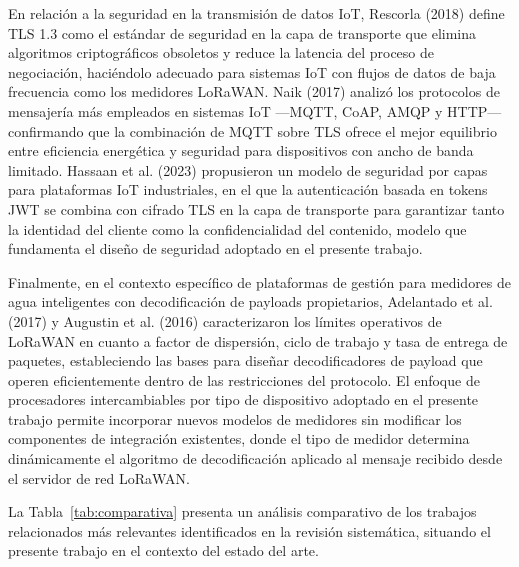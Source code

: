 \documentclass[12pt,a4paper,oneside]{report}
\begin{document}
En relación a la seguridad en la transmisión de datos IoT, Rescorla (2018) define TLS 1.3 como el estándar de seguridad en la capa de transporte que elimina algoritmos criptográficos obsoletos y reduce la latencia del proceso de negociación, haciéndolo adecuado para sistemas IoT con flujos de datos de baja frecuencia como los medidores LoRaWAN. Naik (2017) analizó los protocolos de mensajería más empleados en sistemas IoT ---MQTT, CoAP, AMQP y HTTP--- confirmando que la combinación de MQTT sobre TLS ofrece el mejor equilibrio entre eficiencia energética y seguridad para dispositivos con ancho de banda limitado. Hassaan et al. (2023) propusieron un modelo de seguridad por capas para plataformas IoT industriales, en el que la autenticación basada en tokens JWT se combina con cifrado TLS en la capa de transporte para garantizar tanto la identidad del cliente como la confidencialidad del contenido, modelo que fundamenta el diseño de seguridad adoptado en el presente trabajo.

Finalmente, en el contexto específico de plataformas de gestión para medidores de agua inteligentes con decodificación de payloads propietarios, Adelantado et al. (2017) y Augustin et al. (2016) caracterizaron los límites operativos de LoRaWAN en cuanto a factor de dispersión, ciclo de trabajo y tasa de entrega de paquetes, estableciendo las bases para diseñar decodificadores de payload que operen eficientemente dentro de las restricciones del protocolo. El enfoque de procesadores intercambiables por tipo de dispositivo adoptado en el presente trabajo permite incorporar nuevos modelos de medidores sin modificar los componentes de integración existentes, donde el tipo de medidor determina dinámicamente el algoritmo de decodificación aplicado al mensaje recibido desde el servidor de red LoRaWAN.

La Tabla~\ref{tab:comparativa} presenta un análisis comparativo de los trabajos relacionados más relevantes identificados en la revisión sistemática, situando el presente trabajo en el contexto del estado del arte.
\end{document}
